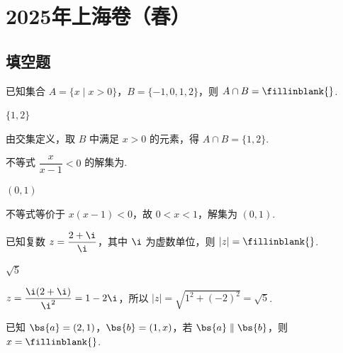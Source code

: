 \documentclass[UTF8,a4paper,oneside,11pt]{ctexbook}
\begin{document}
\mainmatter

\chapter{2025年上海卷（春）}

\section{填空题}

\begin{problem}
已知集合 \(A=\{x\mid x>0\}\)，\(B=\{-1,0,1,2\}\)，则 \(A\cap B=\fillinblank{}\).
\end{problem}

\begin{answer}
\(\{1,2\}\)
\end{answer}

\begin{solution}
由交集定义，取 \(B\) 中满足 \(x>0\) 的元素，得 \(A\cap B=\{1,2\}\).
\end{solution}

\begin{problem}
不等式 \(\dfrac{x}{x-1}<0\) 的解集为\fillinblank{}.
\end{problem}

\begin{answer}
\((0,1)\)
\end{answer}

\begin{solution}
不等式等价于 \(x(x-1)<0\)，故 \(0<x<1\)，解集为 \((0,1)\).
\end{solution}

\begin{problem}
已知复数 \(z=\dfrac{2+\i}{\i}\)，其中 \(\i\) 为虚数单位，则 \(|z|=\fillinblank{}\).
\end{problem}

\begin{answer}
\(\sqrt5\)
\end{answer}

\begin{solution}
\(z=\dfrac{\i(2+\i)}{\i^2}=1-2\i\)，所以 \(|z|=\sqrt{1^2+(-2)^2}=\sqrt5\).
\end{solution}

\begin{problem}
已知 \(\bs{a}=(2,1)\)，\(\bs{b}=(1,x)\)，若 \(\bs{a}\parallel\bs{b}\)，则 \(x=\fillinblank{}\).
\end{problem}
\end{document}
